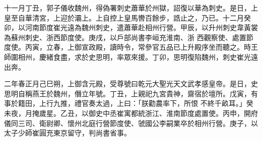 \begin{pinyinscope}
 十一月丁丑，郭子儀收魏州，得偽署刺史蕭華於州獄，詔復以華為刺史。是日，上皇至自華清宮，上迎於灞上。上自控上皇馬轡百餘步，誥止之，乃已。十二月癸卯，以河南節度崔光遠為魏州刺史，遣蕭華赴相州行營。甲辰，以升州刺史韋黃裳為蘇州刺史、浙西節度使。庚戌，以戶部尚書李峘充淮南、浙
 西觀察使、處置節度使。丙寅，立春，上御宣政殿，讀時令，常參官五品已上升殿序坐而聽之。時王師圍相州，慶緒食盡，求於史思明，率眾來援。丁卯，思明復陷魏州，刺史崔光遠出奔。



 二年春正月己巳朔，上御含元殿，受尊號曰乾元大聖光天文武孝感皇帝。是日，史思明自稱燕王於魏州，僭立年號。丁丑，上親祀九宮貴神，齋宿於壇所。戊寅，有事於籍田，上行九推，禮官奏太過，上曰：「朕勸農率下，所恨
 不終千畝耳。」癸未夜，月掩歲星。乙丑，以御史中丞崔寓都統浙江、淮南節度處置使。丙申，開府儀同三司、衛尉卿、懷州北庭行營節度使、虢國公李嗣業卒於相州行營。庚子，以太子少師崔圓充東京留守，判尚書省事。




\end{pinyinscope}
